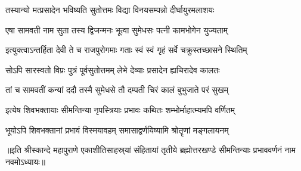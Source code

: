 \twolineshloka
{तस्यान्यो मत्प्रसादेन भविष्यति सुतोत्तमः}
{विद्या विनयसम्पन्नो दीर्घायुरमलाशयः} %

\twolineshloka
{एषा सामवती नाम सुता तस्य द्विजन्मनः}
{भूत्वा सुमेधसः पत्नी कामभोगेन युज्यताम्} %

\twolineshloka
{इत्युक्त्वाऽन्तर्हिता देवी ते च राजपुरोगमाः}
{गताः स्वं स्वं गृहं सर्वे चक्रुस्तच्छासने स्थितिम्} %

\twolineshloka
{सोऽपि सारस्वतो विप्रः पुत्रं पूर्वसुतोत्तमम्}
{लेभे देव्याः प्रसादेन ह्यचिरादेव कालतः} %

\twolineshloka
{तां च सामवतीं कन्यां ददौ तस्मै सुमेधसे}
{तौ दम्पती चिरं कालं बुभुजाते परं सुखम्} %

\twolineshloka
{इत्येष शिवभक्तायाः सीमन्तिन्या नृपस्त्रियाः}
{प्रभावः कथितः शम्भोर्माहात्म्यमपि वर्णितम्} %

\twolineshloka
{भूयोऽपि शिवभक्तानां प्रभावं विस्मयावहम्}
{समासाद्वर्णयिष्यामि श्रोतॄणां मङ्गलायनम्} %

{॥इति श्रीस्कान्दे महापुराणे एकाशीतिसाहस्र्यां संहितायां तृतीये ब्रह्मोत्तरखण्डे सीमन्तिन्याः प्रभाववर्णनं नाम नवमोऽध्यायः॥} 

